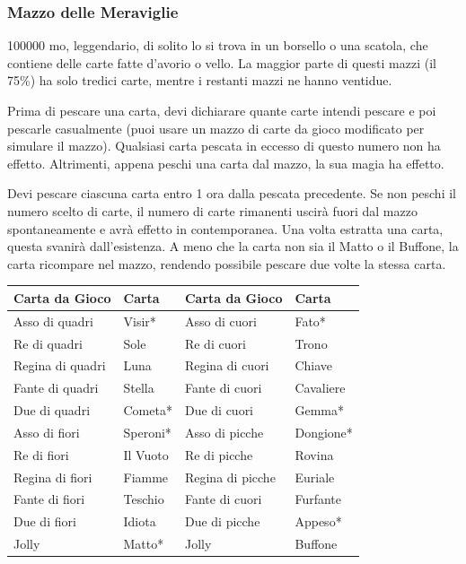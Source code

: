 \begin{multicols}{2}

\medskip

\subsubsection*{Mazzo delle Meraviglie}
100000 mo, leggendario, di solito lo si trova in un borsello o una scatola, che contiene delle carte fatte d'avorio o vello. La maggior parte di questi mazzi (il 75\%) ha solo tredici carte, mentre i restanti mazzi ne hanno ventidue.

Prima di pescare una carta, devi dichiarare quante carte intendi pescare e poi pescarle casualmente (puoi usare un mazzo di carte da gioco modificato per simulare il mazzo). Qualsiasi carta pescata in eccesso di questo numero non ha effetto. Altrimenti, appena peschi una carta dal mazzo, la sua magia ha effetto.

Devi pescare ciascuna carta entro 1 ora dalla pescata precedente. Se non peschi il numero scelto di carte, il numero di carte rimanenti uscirà fuori dal mazzo spontaneamente e avrà effetto in contemporanea. Una volta estratta una carta, questa svanirà dall'esistenza. A meno che la carta non sia il Matto o il Buffone, la carta ricompare nel mazzo, rendendo possibile pescare due volte la stessa carta.

\medskip

\end{multicols}

\begin{tabularx}{0.95\textwidth}{lX|lX}
\textbf{Carta da Gioco}& \textbf{Carta}&\textbf{Carta da Gioco}& \textbf{Carta}\\
\hline
Asso di quadri& Visir*&Asso di cuori &Fato*\\
Re di quadri &Sole&Re di cuori &Trono\\
Regina di quadri& Luna&Regina di cuori& Chiave\\
Fante di quadri &Stella&Fante di cuori& Cavaliere\\
Due di quadri &Cometa*&Due di cuori &Gemma*\\
Asso di fiori &Speroni*&Asso di picche& Dongione*\\
Re di fiori &Il Vuoto&Re di picche& Rovina\\
Regina di fiori& Fiamme&Regina di picche &Euriale\\
Fante di fiori &Teschio&Fante di cuori& Furfante\\
Due di fiori &Idiota&Due di picche &Appeso*\\
Jolly &Matto*&Jolly &Buffone\\
\end{tabularx}

